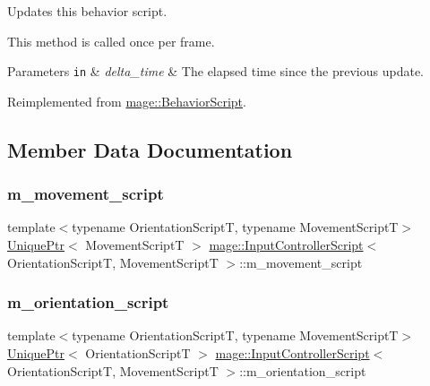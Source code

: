 Updates this behavior script.

This method is called once per frame.


\begin{DoxyParams}[1]{Parameters}
\mbox{\tt in}  & {\em delta\+\_\+time} & The elapsed time since the previous update. \\
\hline
\end{DoxyParams}


Reimplemented from \hyperlink{classmage_1_1_behavior_script_a58c0fb3e1f2f3fb3a41e658a99b84a21}{mage\+::\+Behavior\+Script}.



\subsection{Member Data Documentation}
\hypertarget{classmage_1_1_input_controller_script_aea0478602dbabf616dd3ef8b4408a42a}{}\label{classmage_1_1_input_controller_script_aea0478602dbabf616dd3ef8b4408a42a} 
\subsubsection{\texorpdfstring{m\+\_\+movement\+\_\+script}{m\_movement\_script}}
{\footnotesize\ttfamily template$<$typename Orientation\+ScriptT, typename Movement\+ScriptT$>$ \\
\hyperlink{namespacemage_a3316d7143a973e37adf1110f2e80ca31}{Unique\+Ptr}$<$ Movement\+ScriptT $>$ \hyperlink{classmage_1_1_input_controller_script}{mage\+::\+Input\+Controller\+Script}$<$ Orientation\+ScriptT, Movement\+ScriptT $>$\+::m\+\_\+movement\+\_\+script\hspace{0.3cm}{\ttfamily [private]}}

\hypertarget{classmage_1_1_input_controller_script_ab5af05a3bf7cdd672382dd5bcb1d6d02}{}\label{classmage_1_1_input_controller_script_ab5af05a3bf7cdd672382dd5bcb1d6d02} 
\subsubsection{\texorpdfstring{m\+\_\+orientation\+\_\+script}{m\_orientation\_script}}
{\footnotesize\ttfamily template$<$typename Orientation\+ScriptT, typename Movement\+ScriptT$>$ \\
\hyperlink{namespacemage_a3316d7143a973e37adf1110f2e80ca31}{Unique\+Ptr}$<$ Orientation\+ScriptT $>$ \hyperlink{classmage_1_1_input_controller_script}{mage\+::\+Input\+Controller\+Script}$<$ Orientation\+ScriptT, Movement\+ScriptT $>$\+::m\+\_\+orientation\+\_\+script\hspace{0.3cm}{\ttfamily [private]}}

